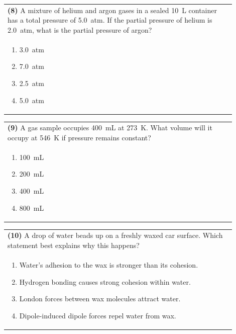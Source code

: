 \documentclass{article}
\begin{document}
{{\vspace{0.2cm}
\noindent\begin{tabular}{|p{0.9\linewidth}|}
\hline
\textbf{(8)} A mixture of helium and argon gases in a sealed 10~L container has a total pressure of 5.0~atm. If the partial pressure of helium is 2.0~atm, what is the partial pressure of argon?\\[0.2cm]
\begin{minipage}[t]{0.85\linewidth}
\begin{enumerate}[label=\alph*.]
\item 3.0~atm
\item 7.0~atm
\item 2.5~atm
\item 5.0~atm
\end{enumerate}
\end{minipage}\\[0.2cm]
\hline
\end{tabular}
\newpage

\vspace{0.2cm}
\noindent\begin{tabular}{|p{0.9\linewidth}|}
\hline
\textbf{(9)} A gas sample occupies 400~mL at 273~K. What volume will it occupy at 546~K if pressure remains constant?\\[0.2cm]
\begin{minipage}[t]{0.85\linewidth}
\begin{enumerate}[label=\alph*.]
\item 100~mL
\item 200~mL
\item 400~mL
\item 800~mL
\end{enumerate}
\end{minipage}\\[0.2cm]
\hline
\end{tabular}

\noindent\begin{tabular}{|p{0.9\linewidth}|}
\hline
\textbf{(10)} A drop of water beads up on a freshly waxed car surface. Which statement best explains why this happens?\\[0.2cm]
\begin{minipage}[t]{0.85\linewidth}
\begin{enumerate}[label=\alph*.]
\item Water's adhesion to the wax is stronger than its cohesion.
\item Hydrogen bonding causes strong cohesion within water.
\item London forces between wax molecules attract water.
\item Dipole-induced dipole forces repel water from wax.
\end{enumerate}
\end{minipage}\\[0.2cm]
\hline
\end{tabular}

}}
\end{document}
